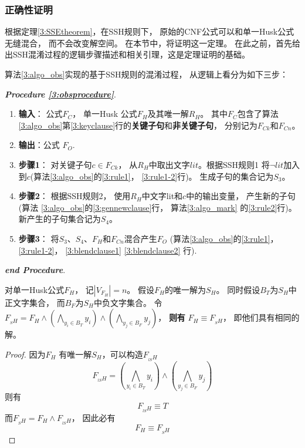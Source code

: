 \subsubsection{正确性证明}\label{3:correctness}
根据定理\ref{3:SSEtheorem}，在SSH规则下，
原始的CNF公式可以和单一Husk公式无缝混合， 而不会改变解空间。
在本节中，将证明这一定理。
在此之前，首先给出SSH混淆过程的逻辑步骤描述和相关引理，这是定理证明的基础。

算法\ref{3:algo_obs}实现的基于SSH规则的混淆过程，
从逻辑上看分为如下三步：

\textit{\textbf{Procedure \ref{3:obsprocedure}}}.
\begin{enumerate}
\item[]\label{3:obsprocedure}
   \textbf{输入}：
   公式$F_C$，
   单一Husk 公式$F_H$及其唯一解$R_H$。
   其中$F_C$包含了算法\ref{3:algo_obs}第\ref{3:keyclause}行的\textbf{关键子句}和\textbf{非关键子句}，
   分别记为$F_{Ck}$和$F_{Cn}$。
\item[] \textbf{输出}：公式 $F_O$.
\item[]\textbf{步骤1}：
   对关键子句$c\in F_{Ck}$，
   从$R_H$中取出文字$lit$。根据SSH规则1
   将$\neg lit$加入到$c$(算法\ref{3:algo_obs}的\ref{3:rule1}， \ref{3:rule1-2}行)。
   生成子句的集合记为$S_3$。
\item[]\textbf{步骤2}：
   根据SSH规则2，
   使用$R_H$中文字lit和$c$中的输出变量，
   产生新的子句(算法 \ref{3:algo_obs}的\ref{3:gennewclause}行，
   算法\ref{3:algo_mark} 的\ref{3:rule2}行)。
   新产生的子句集合记为$S_4$。
\item[]\textbf{步骤3}：
   将$S_3$、$S_4$、$F_H$和$F_{Cn}$混合产生$F_O$ (算法\ref{3:algo_obs}的\ref{3:rule1}， \ref{3:rule1-2}， \ref{3:blendclause1} \ref{3:blendclause2} 行).
\end{enumerate}

\textit{\textbf{end Procedure}}.

\begin{lemma}\label{3:SHE}

对单一Husk公式${F_H}$，
记$|V_{F_H}|= n$。
假设$F_H$的唯一解为$S_H$。
同时假设$B_T$为$S_H$中正文字集合，
而$B_F$为$S_H$中负文字集合。
令$F_{_SH}=F_H\wedge (\bigwedge_{y_i\in B_T}y_i)\wedge(\bigwedge _{y_j\in B_F}y_j)$，
\textbf{则有} $F_H \equiv F_{_SH}$，
即他们具有相同的解。
\end{lemma}
\begin{proof}
因为$F_H$ 有唯一解$S_H$，可以构造$F_{_{lS}H}$
\begin{equation}
 F_{_{lS}H}=(\bigwedge_{y_i\in B_T}y_i)\wedge(\bigwedge _{y_j\in B_F}y_j)
\end{equation}
则有
\begin{equation}
 F_{_{lS}H} \equiv T
\end{equation}
而$F_{_SH}= F_H \wedge F_{_{lS}H}$，
因此必有
\begin{equation}
F_H \equiv F_{_SH}
\end{equation}
\end{proof}

